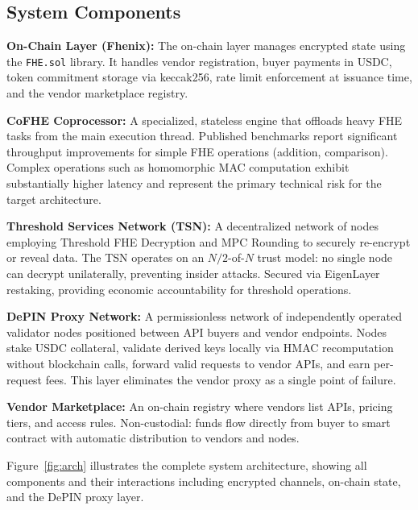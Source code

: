 \documentclass[conference]{IEEEtran}
\begin{document}
\subsection{System Components}

\textbf{On-Chain Layer (Fhenix):} The on-chain layer manages encrypted state using the
\texttt{FHE.sol} library. It handles vendor registration, buyer payments in USDC,
token commitment storage via keccak256, rate limit enforcement at issuance time, and
the vendor marketplace registry.

\textbf{CoFHE Coprocessor:} A specialized, stateless engine that offloads heavy FHE
tasks from the main execution thread. Published benchmarks report significant throughput
improvements for simple FHE operations (addition, comparison). Complex operations such
as homomorphic MAC computation exhibit substantially higher latency and represent the
primary technical risk for the target architecture.

\textbf{Threshold Services Network (TSN):} A decentralized network of nodes employing
Threshold FHE Decryption and MPC Rounding \cite{mpc_rounding} to securely re-encrypt
or reveal data. The TSN operates on an $N/2$-of-$N$ trust model: no single node can
decrypt unilaterally, preventing insider attacks. Secured via EigenLayer restaking,
providing economic accountability for threshold operations.

\textbf{DePIN Proxy Network:} A permissionless network of independently operated validator
nodes positioned between API buyers and vendor endpoints. Nodes stake USDC collateral,
validate derived keys locally via HMAC recomputation without blockchain calls, forward
valid requests to vendor APIs, and earn per-request fees. This layer eliminates the
vendor proxy as a single point of failure.

\textbf{Vendor Marketplace:} An on-chain registry where vendors list APIs, pricing tiers,
and access rules. Non-custodial: funds flow directly from buyer to smart contract with
automatic distribution to vendors and nodes.

Figure~\ref{fig:arch} illustrates the complete system architecture, showing all
components and their interactions including encrypted channels, on-chain state, and the
DePIN proxy layer.
\end{document}
